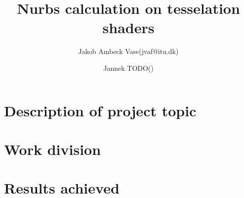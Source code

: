 \documentclass[hidelinks]{paper}
\author{Jakob Ambeck Vase(jvaf@itu.dk) \and Jannek TODO()}
\title{Nurbs calculation on tesselation shaders}
\begin{document}
\maketitle
\listoftodos
\tableofcontents
\begin{abstract}
\end{abstract}
\section{Description of project topic}

\section{Work division}

\section{Results achieved}

\end{document}
